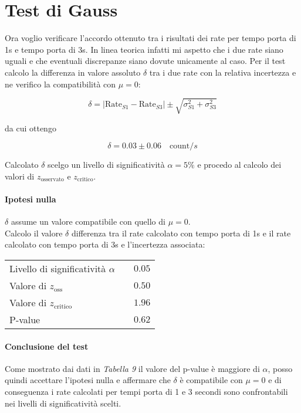\documentclass{article}
\begin{document}
\newpage
\section{Test di Gauss}
Ora voglio verificare l'accordo ottenuto tra i risultati dei rate per tempo porta di 1s e tempo porta di 3s. In linea teorica infatti mi aspetto che i due rate siano uguali e che eventuali discrepanze siano dovute unicamente al caso. Per il test calcolo la differenza in valore assoluto $\delta$ tra i due rate con la relativa incertezza e ne verifico la compatibilità con $\mu = 0$:


\[
	\delta = \left| \text{Rate}_{S1} - \text{Rate}_{S3} \right| \pm  \sqrt{\sigma_{S1}^2 + \sigma_{S3}^2}
\]

da cui ottengo

\[
	\delta = 0.03 \pm 0.06 \quad \text{count}/s	
\]

Calcolato $\delta$ scelgo un livello di significatività $\alpha = 5\%$ e procedo al calcolo dei valori di $z_{\text{osservato}}$ e $z_{\text{critico}}$.

\paragraph{Ipotesi nulla} $\delta$ assume un valore compatibile con quello di $\mu = 0$.  \\


\noindent
Calcolo il valore $\delta$ differenza tra il rate calcolato con tempo porta di 1s e il rate calcolato con tempo porta di 3s e l'incertezza associata:

\vspace{0.2cm}
\begin{center}
\begin{tabular}{lr}
	Livello di significatività $\alpha$	& $\quad 0.05$  \\
	Valore di $z_\text{oss}$             	& $\quad 0.50$  \\
	Valore di $z_{\text{critico}}$ 		& $\quad 1.96$  \\
	P-value 				& $\quad 0.62$  
\end{tabular}
\end{center}

\paragraph{Conclusione del test} Come mostrato dai dati in \textit{Tabella 9} il valore del p-value è maggiore di $\alpha$, posso quindi accettare l'ipotesi nulla e affermare che $\delta$ è compatibile con $\mu = 0$ e di conseguenza i rate calcolati per tempi porta di 1 e 3 secondi sono confrontabili nei livelli di significatività scelti.  
\end{document}
